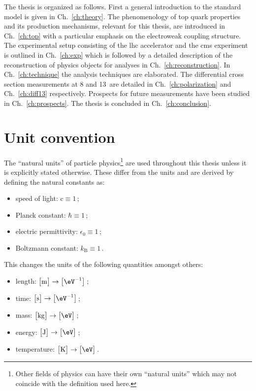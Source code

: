 The thesis is organized as follows. First a general introduction to the standard model is given in Ch.~\ref{ch:theory}. The phenomenology of top quark properties and its production mechanisms, relevant for this thesis, are introduced in Ch.~\ref{ch:top} with a particular emphasis on the electroweak coupling structure. The experimental setup consisting of the \gls{lhc} accelerator and the \gls{cms} experiment is outlined in Ch.~\ref{ch:exp} which is followed by a detailed description of the reconstruction of physics objects for analyses in Ch.~\ref{ch:reconstruction}. In Ch.~\ref{ch:technique} the analysis techniques are elaborated. The differential cross section measurements at 8 and 13~\TeV are detailed in Ch.~\ref{ch:polarization} and Ch.~\ref{ch:diff13} respectively. Prospects for future measurements have been studied in Ch.~\ref{ch:prospects}. The thesis is concluded in Ch.~\ref{ch:conclusion}.


\section*{Unit convention}

The ``natural units'' of particle physics\footnote{Other fields of physics can have their own ``natural units'' which may not coincide with the definition used here.} are used throughout this thesis unless it is explicitly stated otherwise. These differ from the  units and are derived by defining the natural constants as:

\begin{itemize}
\item speed of light: $\mathrm{c}\equiv 1$\,;
\item Planck constant: $\hbar\equiv 1$\,;
\item electric permittivity: $\epsilon_{0}\equiv 1$\,;
\item Boltzmann constant: $k_\mathrm{B}\equiv 1$\,.
\end{itemize}

This changes the units of the following quantities amongst others:

\begin{itemize}
\item length: $\big[\mathrm{m}\big]\rightarrow \big[\eV^{-1}\big]$\,;
\item time: $\big[\mathrm{s}\big]\rightarrow \big[\eV^{-1}\big]$\,;
\item mass: $\big[\mathrm{kg}\big]\rightarrow \big[\eV\big]$\,;
\item energy: $\big[\mathrm{J}\big]\rightarrow \big[\eV\big]$\,;
\item temperature: $\big[\mathrm{K}\big]\rightarrow \big[\eV\big]$\,.
\end{itemize}



